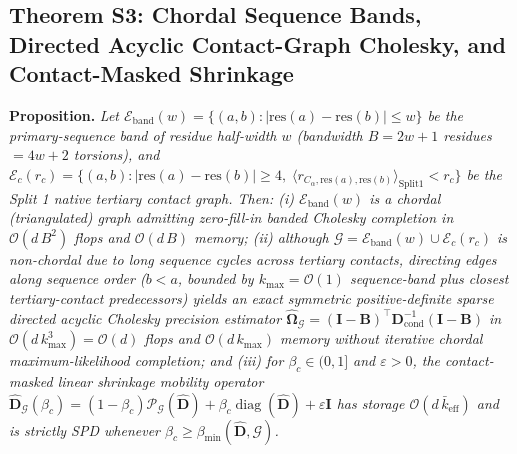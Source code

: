 \documentclass[10pt,letterpaper]{article}
\DeclareMathOperator{\diag}{diag}
\begin{document}
\subsection{Theorem S3: Chordal Sequence Bands, Directed Acyclic Contact-Graph Cholesky, and Contact-Masked Shrinkage}
\textbf{Proposition.} \textit{Let $\mathcal{E}_{\mathrm{band}}(w) = \{(a,b): |\mathrm{res}(a)-\mathrm{res}(b)|\le w\}$ be the primary-sequence band of residue half-width $w$ (bandwidth $B = 2w+1$ residues $= 4w+2$ torsions), and $\mathcal{E}_c(r_c) = \{(a,b): |\mathrm{res}(a)-\mathrm{res}(b)|\ge 4,\; \langle r_{C_\alpha,\mathrm{res}(a),\mathrm{res}(b)}\rangle_{\mathrm{Split1}} < r_c\}$ be the Split 1 native tertiary contact graph. Then: (i) $\mathcal{E}_{\mathrm{band}}(w)$ is a chordal (triangulated) graph admitting zero-fill-in banded Cholesky completion in $\mathcal{O}(d\,B^2)$ flops and $\mathcal{O}(d\,B)$ memory; (ii) although $\mathcal{G} = \mathcal{E}_{\mathrm{band}}(w) \cup \mathcal{E}_c(r_c)$ is non-chordal due to long sequence cycles across tertiary contacts, directing edges along sequence order ($b < a$, bounded by $k_{\max} = \mathcal{O}(1)$ sequence-band plus closest tertiary-contact predecessors) yields an exact symmetric positive-definite sparse directed acyclic Cholesky precision estimator $\hat{\bm{\Omega}}_{\mathcal{G}} = (\mathbf{I}-\mathbf{B})^\top\mathbf{D}_{\mathrm{cond}}^{-1}(\mathbf{I}-\mathbf{B})$ in $\mathcal{O}(d\,k_{\max}^3) = \mathcal{O}(d)$ flops and $\mathcal{O}(d\,k_{\max})$ memory without iterative chordal maximum-likelihood completion; and (iii) for $\beta_c \in (0,1]$ and $\varepsilon > 0$, the contact-masked linear shrinkage mobility operator $\hat{\mathbf{D}}_{\mathcal{G}}(\beta_c) = (1-\beta_c)\mathcal{P}_{\mathcal{G}}(\hat{\mathbf{D}}) + \beta_c\diag(\hat{\mathbf{D}}) + \varepsilon\mathbf{I}$ has storage $\mathcal{O}(d\,\bar{k}_{\mathrm{eff}})$ and is strictly SPD whenever $\beta_c \ge \beta_{\min}(\hat{\mathbf{D}},\mathcal{G})$.}
\end{document}
